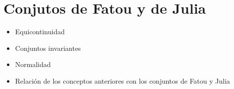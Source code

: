 \chapter{Conjutos de Fatou y de Julia}

\begin{itemize}
    \item Equicontinuidad
    \item Conjuntos invariantes
    \item Normalidad
    \item Relación de los conceptos anteriores con los conjuntos de Fatou y
    Julia
\end{itemize}